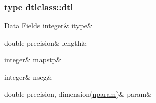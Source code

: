 \subsubsection{type dtlclass\+::dtl}
\begin{DoxyFields}{Data Fields}
\mbox{\label{namespacedtlclass_a75f1d8c2908cb2ac40cd24dc45a122ff}} 
integer&
itype&
\\
\hline

\mbox{\label{namespacedtlclass_ac3b7a490164af376dab82d59957bcdd3}} 
double precision&
length&
\\
\hline

\mbox{\label{namespacedtlclass_ad89c7805074fee80c05af3ae3861cb87}} 
integer&
mapstp&
\\
\hline

\mbox{\label{namespacedtlclass_ab0c5195ab0993ee3107484257b94cfe5}} 
integer&
nseg&
\\
\hline

\mbox{\label{namespacedtlclass_a95bc1c81e12444e39d8ea61b6e67ae34}} 
double precision, dimension(\mbox{\hyperlink{namespacedtlclass_adf04761c96168c3dc492c89c72194cea}{nparam}})&
param&
\\
\hline

\end{DoxyFields}
